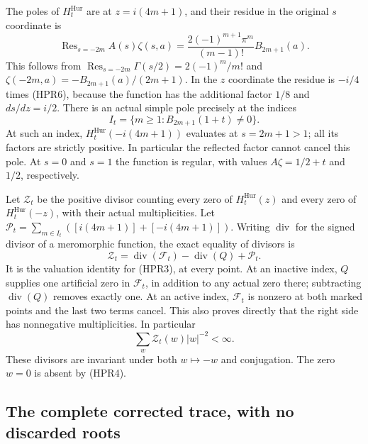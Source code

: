 The poles of $H_t^{\mathrm{Hur}}$ are at $z=i(4m+1)$, and their residue in the
original $s$ coordinate is
\begin{equation}\tag{HPR6}
 \operatorname{Res}_{s=-2m} A(s)\zeta(s,a)
 =\frac{2(-1)^{m+1}\pi^m}{(m-1)!}B_{2m+1}(a).
\end{equation}
This follows from
$\operatorname{Res}_{s=-2m}\Gamma(s/2)=2(-1)^m/m!$
and $\zeta(-2m,a)=-B_{2m+1}(a)/(2m+1)$.
In the $z$ coordinate the residue is $-i/4$ times (HPR6),
because the function has the additional factor $1/8$ and $ds/dz=i/2$.
There is an actual simple pole precisely at the indices
\[
 I_t=\{m\ge1:B_{2m+1}(1+t)\ne0\}.
\]
At such an index, $H_t^{\mathrm{Hur}}(-i(4m+1))$ evaluates at $s=2m+1>1$;
all its factors are strictly positive. In particular the reflected
factor cannot cancel this pole. At $s=0$ and $s=1$ the function is
regular, with values $A\zeta=1/2+t$ and $1/2$, respectively.

Let $\mathcal Z_t$ be the positive divisor counting every zero of
$H_t^{\mathrm{Hur}}(z)$ and every zero of $H_t^{\mathrm{Hur}}(-z)$, with their actual multiplicities.
Let $\mathcal P_t=\sum_{m\in I_t}([i(4m+1)]+[-i(4m+1)])$.
Writing $\operatorname{div}$ for the signed divisor of a meromorphic
function, the exact equality of divisors is
\begin{equation}\tag{HPR7}
 \mathcal Z_t=\operatorname{div}(\mathscr F_t)-\operatorname{div}(Q)
                         +\mathcal P_t.
\end{equation}
It is the valuation identity for (HPR3), at every point. At an inactive
index, $Q$ supplies one artificial zero in $\mathscr F_t$, in addition to any
actual zero there; subtracting $\operatorname{div}(Q)$ removes exactly
one. At an active index, $\mathscr F_t$ is nonzero at both marked points and
the last two terms cancel. This also proves directly that the right
side has nonnegative multiplicities. In particular
\[
 \sum_{w}\mathcal Z_t(w)|w|^{-2}<\infty.
\]
These divisors are invariant under both $w\mapsto-w$ and conjugation.
The zero $w=0$ is absent by (HPR4).

\subsection{The complete corrected trace, with no discarded roots}


